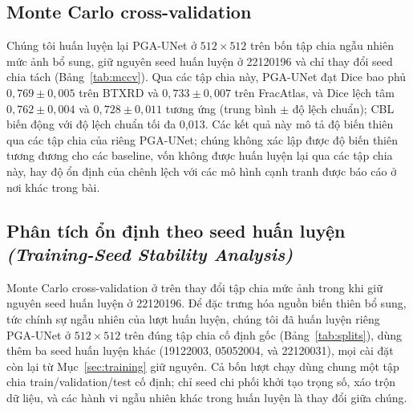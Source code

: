 \documentclass[11pt]{article}
\newcommand{\enlabel}[1]{{\small\itshape\color{gray} (#1)}}
\begin{document}
\subsection{Monte Carlo cross-validation}
\label{sec:mccv}
Chúng tôi huấn luyện lại PGA-UNet ở $512\times512$ trên bốn tập chia ngẫu nhiên mức ảnh bổ sung, giữ nguyên seed huấn luyện ở 22120196 và chỉ thay đổi seed chia tách (Bảng~\ref{tab:mccv}). Qua các tập chia này, PGA-UNet đạt Dice bao phủ $0,769\pm0,005$ trên BTXRD và $0,733\pm0,007$ trên FracAtlas, và Dice lệch tâm $0,762\pm0,004$ và $0,728\pm0,011$ tương ứng (trung bình $\pm$ độ lệch chuẩn); CBL biến động với độ lệch chuẩn tối đa 0,013. Các kết quả này mô tả độ biến thiên qua các tập chia của riêng PGA-UNet; chúng không xác lập được độ biến thiên tương đương cho các baseline, vốn không được huấn luyện lại qua các tập chia này, hay độ ổn định của chênh lệch với các mô hình cạnh tranh được báo cáo ở nơi khác trong bài.

\begin{table}[H]
\caption{Monte Carlo cross-validation của PGA-UNet ở $512\times512$, bốn lần chia ngẫu nhiên mức ảnh lặp lại, trung bình $\pm$ độ lệch chuẩn.}
\label{tab:mccv}
\centering
\scriptsize
{}
\end{table}

\subsection{Phân tích ổn định theo seed huấn luyện \enlabel{Training-Seed Stability Analysis}}
\label{sec:seedstability}
Monte Carlo cross-validation ở trên thay đổi tập chia mức ảnh trong khi giữ nguyên seed huấn luyện ở 22120196. Để đặc trưng hóa nguồn biến thiên bổ sung, tức chính sự ngẫu nhiên của lượt huấn luyện, chúng tôi đã huấn luyện riêng PGA-UNet ở $512\times512$ trên đúng tập chia cố định gốc (Bảng~\ref{tab:splits}), dùng thêm ba seed huấn luyện khác (19122003, 05052004, và 22120031), mọi cài đặt còn lại từ Mục~\ref{sec:training} giữ nguyên. Cả bốn lượt chạy dùng chung một tập chia train/validation/test cố định; chỉ seed chi phối khởi tạo trọng số, xáo trộn dữ liệu, và các hành vi ngẫu nhiên khác trong huấn luyện là thay đổi giữa chúng.
\end{document}
